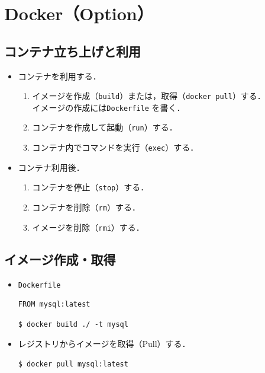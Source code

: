 \section{Docker（Option）}\label{chap:docker}
\tocc
\subsection{コンテナ立ち上げと利用}
\begin{frame}[t]{\ftitle}
    \begin{itemize}
        \setlength{\itemsep}{1em}
        \item コンテナを利用する．
              \begin{enumerate}
                  \setlength{\itemsep}{.5em}
                  \item イメージを作成（\texttt{build}）または，取得（\texttt{docker pull}）する．\\
                        イメージの作成には\texttt{Dockerfile} を書く．
                  \item コンテナを作成して起動（\texttt{run}）する．
                  \item コンテナ内でコマンドを実行（\texttt{exec}）する．
              \end{enumerate}
        \item コンテナ利用後．
              \begin{enumerate}
                  \setlength{\itemsep}{.5em}
                  \item コンテナを停止（\texttt{stop}）する．
                  \item コンテナを削除（\texttt{rm}）する．
                  \item イメージを削除（\texttt{rmi}）する．
              \end{enumerate}
    \end{itemize}
\end{frame}
\subsection{イメージ作成・取得}
\begin{frame}[containsverbatim,t]{\ftitle}
    \begin{itemize}
        \item \texttt{Dockerfile}
              \begin{lstlisting}[language=docker-compose-2]
FROM mysql:latest
            \end{lstlisting}
              \begin{lstlisting}[backgroundcolor={\color{black}},basicstyle={\color{white}\ttfamily},]
$ docker build ./ -t mysql
                            \end{lstlisting}
        \item レジストリからイメージを取得（Pull）する．
              \begin{lstlisting}[backgroundcolor={\color{black}},basicstyle={\color{white}\ttfamily},]
$ docker pull mysql:latest
            \end{lstlisting}
    \end{itemize}
\end{frame}
